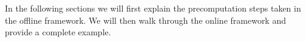 In the following sections we will first explain the precomputation steps taken in the offline framework. We will then walk through the online framework and provide a complete example.
%
%
%
%
%
